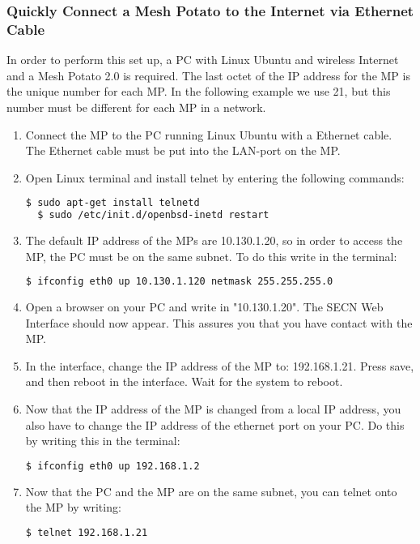 \subsubsection{Quickly Connect a Mesh Potato to the Internet via Ethernet Cable}

In order to perform this set up, a PC with Linux Ubuntu and wireless Internet and a Mesh Potato 2.0 is required. The last octet of the IP address for the MP is the unique number for each MP. In the following example we use 21, but this number must be different for each MP in a network. 

\begin{enumerate}
\item Connect the MP to the PC running Linux Ubuntu with a Ethernet cable. The Ethernet cable must be put into the LAN-port on the MP. 
\item Open Linux terminal and install telnet by entering the following commands: 
\noindent
\begin{lstlisting}[language=bash]
  $ sudo apt-get install telnetd
  $ sudo /etc/init.d/openbsd-inetd restart 
\end{lstlisting}
\item The default IP address of the MPs are 10.130.1.20, so in order to access the MP, the PC must be on the same subnet. To do this write in the terminal: 
\noindent
\begin{lstlisting}[language=bash]
  $ ifconfig eth0 up 10.130.1.120 netmask 255.255.255.0
\end{lstlisting}
\item Open a browser on your PC and write in "10.130.1.20". The SECN Web Interface should now appear. This assures you that you have contact with the MP.
\item In the interface, change the IP address of the MP to: 192.168.1.21. Press save, and then reboot in the interface. Wait for the system to reboot. 
\item Now that the IP address of the MP is changed from a local IP address, you also have to change the IP address of the ethernet port on your PC. Do this by writing this in the terminal:
\noindent
\begin{lstlisting}[language=bash]
  $ ifconfig eth0 up 192.168.1.2
\end{lstlisting}
\item Now that the PC and the MP are on the same subnet, you can telnet onto the MP by writing: 
\noindent
\begin{lstlisting}[language=bash]
  $ telnet 192.168.1.21

\end{lstlisting}
\end{enumerate}
